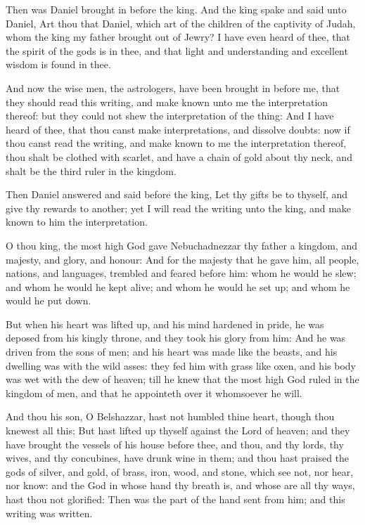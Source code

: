 \verse Then was Daniel brought in before the king. And the king spake and said unto Daniel, Art thou that Daniel, which art of the children of the captivity of Judah, whom the king my father brought out of Jewry?  \verse I have even heard of thee, that the spirit of the gods is in thee, and that light and understanding and excellent wisdom is found in thee.

\verse And now the wise men, the astrologers, have been brought in before me, that they should read this writing, and make known unto me the interpretation thereof: but they could not shew the interpretation of the thing: \verse And I have heard of thee, that thou canst make interpretations, and dissolve doubts: now if thou canst read the writing, and make known to me the interpretation thereof, thou shalt be clothed with scarlet, and have a chain of gold about thy neck, and shalt be the third ruler in the kingdom.

\verse Then Daniel answered and said before the king, Let thy gifts be to thyself, and give thy rewards to another; yet I will read the writing unto the king, and make known to him the interpretation.

\verse O thou king, the most high God gave Nebuchadnezzar thy father a kingdom, and majesty, and glory, and honour: \verse And for the majesty that he gave him, all people, nations, and languages, trembled and feared before him: whom he would he slew; and whom he would he kept alive; and whom he would he set up; and whom he would he put down.

\verse But when his heart was lifted up, and his mind hardened in pride, he was deposed from his kingly throne, and they took his glory from him: \verse And he was driven from the sons of men; and his heart was made like the beasts, and his dwelling was with the wild asses: they fed him with grass like oxen, and his body was wet with the dew of heaven; till he knew that the most high God ruled in the kingdom of men, and that he appointeth over it whomsoever he will.

\verse And thou his son, O Belshazzar, hast not humbled thine heart, though thou knewest all this; \verse But hast lifted up thyself against the Lord of heaven; and they have brought the vessels of his house before thee, and thou, and thy lords, thy wives, and thy concubines, have drunk wine in them; and thou hast praised the gods of silver, and gold, of brass, iron, wood, and stone, which see not, nor hear, nor know: and the God in whose hand thy breath is, and whose are all thy ways, hast thou not glorified: \verse Then was the part of the hand sent from him; and this writing was written.

